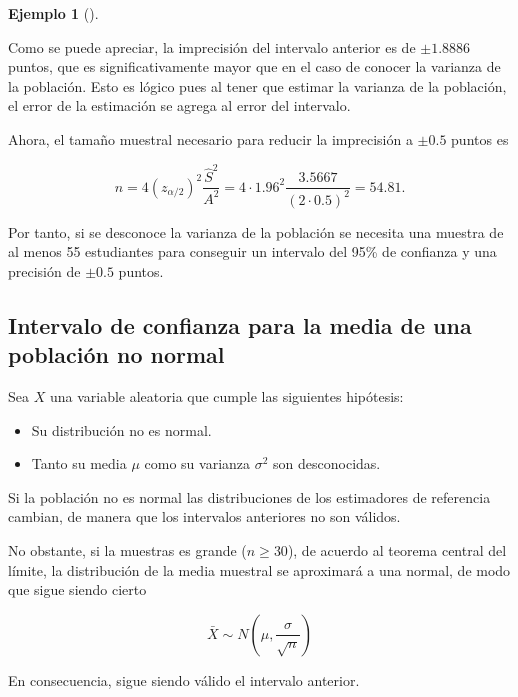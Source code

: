 \documentclass[
  a4paper,
]{scrreport}
\providecommand{\tightlist}{%
  \setlength{\itemsep}{0pt}\setlength{\parskip}{0pt}}\usepackage{longtable,booktabs,array}
\theoremstyle{plain}
\theoremstyle{definition}
\theoremstyle{definition}
\newtheorem{example}{Ejemplo}[chapter]
\theoremstyle{remark}
\begin{document}
\begin{example}[]\protect\hypertarget{exm-tamaño-muestral-ntervalo-confianza-media-normal-varianza-desconocida}{}\label{exm-tamaño-muestral-ntervalo-confianza-media-normal-varianza-desconocida}

Como se puede apreciar, la imprecisión del intervalo anterior es de
\(\pm 1.8886\) puntos, que es significativamente mayor que en el caso de
conocer la varianza de la población. Esto es lógico pues al tener que
estimar la varianza de la población, el error de la estimación se agrega
al error del intervalo.

Ahora, el tamaño muestral necesario para reducir la imprecisión a
\(\pm 0.5\) puntos es

\[
n = 4 (z_{\alpha/2})^2\frac{\hat{S}^2}{A^2} = 4\cdot 1.96^2\frac{3.5667}{(2\cdot 0.5)^2} = 54.81.
\]

Por tanto, si se desconoce la varianza de la población se necesita una
muestra de al menos 55 estudiantes para conseguir un intervalo del 95\%
de confianza y una precisión de \(\pm 0.5\) puntos.

\end{example}

\subsection{Intervalo de confianza para la media de una población no
normal}\label{intervalo-de-confianza-para-la-media-de-una-poblaciuxf3n-no-normal}

Sea \(X\) una variable aleatoria que cumple las siguientes hipótesis:

\begin{itemize}
\tightlist
\item
  Su distribución no es normal.
\item
  Tanto su media \(\mu\) como su varianza \(\sigma^2\) son desconocidas.
\end{itemize}

Si la población no es normal las distribuciones de los estimadores de
referencia cambian, de manera que los intervalos anteriores no son
válidos.

No obstante, si la muestras es grande (\(n\geq 30\)), de acuerdo al
teorema central del límite, la distribución de la media muestral se
aproximará a una normal, de modo que sigue siendo cierto

\[
\bar X \sim N\left(\mu,\frac{\sigma}{\sqrt{n}}\right)
\]

En consecuencia, sigue siendo válido el intervalo anterior.
\end{document}
